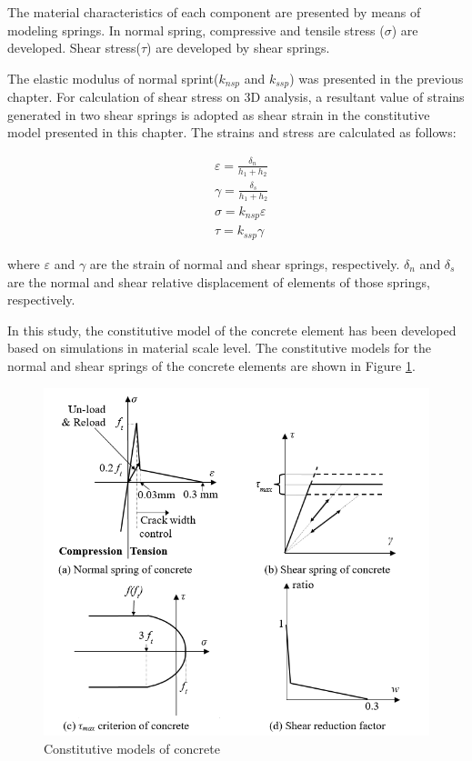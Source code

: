 The material characteristics of each component are presented by means of modeling springs. In normal spring, compressive and tensile stress ($\sigma$) are developed. Shear stress($\tau$) are developed by shear springs.

The elastic modulus of normal sprint($k_{nsp}$ and $k_{ssp}$) was presented in the previous chapter. For calculation of shear stress on 3D analysis, a resultant value of strains generated in two shear springs is adopted as shear strain in the constitutive model presented in this chapter. The strains and stress are calculated as follows:

\begin{equation}
  \begin{aligned}
  &\varepsilon = \frac{\delta_n}{h_1 + h_2}\\
  &\gamma = \frac{\delta_s}{h_1 + h_2}\\
  &\sigma = k_{nsp}\varepsilon\\
  &\tau = k_{ssp}\gamma
  \end{aligned}
\end{equation}

where $\varepsilon$ and $\gamma$ are the strain of normal and shear springs, respectively. $\delta_n$ and $\delta_s$ are the normal and shear relative displacement of elements of those springs, respectively.

In this study, the constitutive model of the concrete element has been developed based on simulations in material scale level. The constitutive models for the normal and shear springs of the concrete elements are shown in Figure \ref{fig:constitutive_model}.

\begin{figure}[ht!]
\centering
\includegraphics[width=.9\linewidth]{Files/Background/graph.png}
  \caption{Constitutive models of concrete}
  \label{fig:constitutive_model}
\end{figure}

